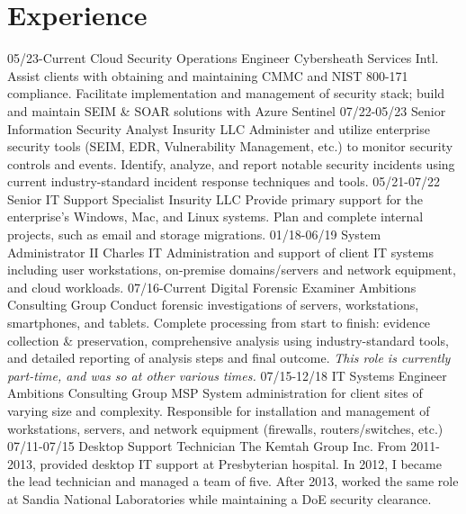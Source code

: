 \documentclass[]{twentysecondcv}
\begin{document}
\section{Experience}
\begin{twenty}
  \twentyitem
    {05/23-Current}
    {Cloud Security Operations Engineer}
    {Cybersheath Services Intl.}
    {Assist clients with obtaining and maintaining CMMC and NIST 800-171 compliance.
    Facilitate implementation and management of security stack; build and maintain
    SEIM \& SOAR solutions with Azure Sentinel}
  \twentyitem
    {07/22-05/23}
    {Senior Information Security Analyst}
    {Insurity LLC}
    {Administer and utilize enterprise security tools (SEIM, EDR, Vulnerability
    Management, etc.) to monitor security controls and events. Identify, analyze,
    and report notable security incidents using current industry-standard incident
    response techniques and tools.}
    \twentyitem
    {05/21-07/22}
    {Senior IT Support Specialist}
    {Insurity LLC}
    {Provide primary support for the enterprise's Windows, Mac, and Linux systems.
    Plan and complete internal projects, such as email and storage migrations.}
    \twentyitem
    {01/18-06/19}
    {System Administrator II}
    {Charles IT}
    {Administration and support of client IT systems including  user workstations,
    on-premise domains\slash servers and network equipment, and cloud workloads.}
    \twentyitem
    {07/16-Current}
    {Digital Forensic Examiner}
    {Ambitions Consulting Group}
    {Conduct forensic investigations of servers, workstations, smartphones, and
    tablets. Complete processing from start to finish: evidence collection \& preservation,
    comprehensive analysis using industry-standard tools, and detailed reporting of
    analysis steps and final outcome. \emph{This role is currently part-time, and was so at
    other various times.}}
    \twentyitem
    {07/15-12/18}
    {IT Systems Engineer}
    {Ambitions Consulting Group}
    {MSP System administration for client sites of varying size and complexity. Responsible
    for installation and management of workstations, servers, and network equipment
    (firewalls, routers/switches, etc.)}
    \twentyitem
    {07/11-07/15}
    {Desktop Support Technician}
    {The Kemtah Group Inc.}
    {From 2011-2013, provided desktop IT support at Presbyterian hospital. In 2012,
    I became the lead technician and managed a team of five. After 2013, worked the
    same role at Sandia National Laboratories while maintaining a DoE security clearance.}

\end{twenty}
\end{document}
